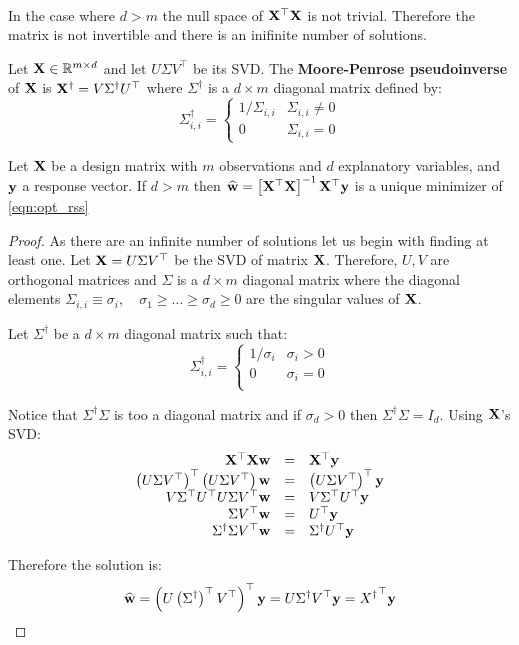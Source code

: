 ~\\In the case where $d>m$ the null space of $\mathbf{X}^\top\mathbf{X}$ is not trivial. Therefore the matrix is not invertible and there is an inifinite number of solutions. 
~\\
\begin{definition}
	Let $\mathbf{X}\in\mathbb{R}^{m\times d}$ and let $U\Sigma V^\top$ be its SVD. The \textbf{Moore-Penrose pseudoinverse} of $\mathbf{X}$ is $\mathbf{X}^\dagger=V\Sigma^\dagger U^\top$ where $\Sigma^\dagger$ is a $d\times m$ diagonal matrix defined by: $$ \Sigma^\dagger_{i,i}=\begin{cases} 1/\Sigma_{i,i} & \Sigma_{i,i}\neq 0 \\ 0 & \Sigma_{i,i}=0 \end{cases} $$
\end{definition}

\begin{theorem}
	Let $\mathbf{X}$ be a design matrix with $m$ observations and $d$ explanatory variables, and $\mathbf{y}$ a response vector. If $d>m$ then $\widehat{\mathbf{w}}=\left[\mathbf{X}^\top\mathbf{X}\right]^{-1}\mathbf{X}^\top\mathbf{y}$ is a unique minimizer of \eqref{eqn:opt_rss}
\end{theorem}
\begin{proof}
	As there are an infinite number of solutions let us begin with finding at least one. Let $\mathbf{X}=U\Sigma V^\top$ be the SVD of matrix $\mathbf{X}$. Therefore, $U,V$ are orthogonal matrices and $\Sigma$ is a $d\times m$ diagonal matrix where the diagonal elements $\Sigma_{i,i}\equiv\sigma_i,\quad \sigma_1\geq\ldots\geq\sigma_d\geq 0$ are the singular values of $\mathbf{X}$.
	
	Let $\Sigma^\dagger$ be a $d\times m$ diagonal matrix such that: 
	$$ \Sigma^\dagger_{i,i} = 
	\begin{cases}
	1/\sigma_i & \sigma_i > 0\\
	0 & \sigma_i = 0\\
	\end{cases} 
	$$
	
	Notice that $\Sigma^\dagger \Sigma$ is too a diagonal matrix and if $\sigma_d>0$ then $\Sigma^\dagger \Sigma=I_d$. Using $\mathbf{X}$'s SVD:
	$$\begin{array}{rcl}
		\mathbf{X}^{\top}\mathbf{X}\mathbf{w} & = & \mathbf{X}^{\top}\mathbf{y} \\
		\left(U\Sigma V^\top\right)^\top \left(U\Sigma V^\top \right)\mathbf{w} & = & \left(U\Sigma V^\top\right)^\top\mathbf{y}\\
		V\Sigma^\top U^\top U\Sigma V^\top\mathbf{w} & = & V\Sigma^\top U^\top \mathbf{y} \\
		\Sigma V^\top \mathbf{w} & = & U^\top\mathbf{y} \\
		\Sigma^\dagger \Sigma V^\top\mathbf{w} & = & \Sigma^\dagger U^\top \mathbf{y} \\
	\end{array}$$
	
	Therefore the solution is: $$ \widehat{\mathbf{w}} = \left(U\left(\Sigma^\dagger\right)^\top V^\top\right)^\top\mathbf{y} = U\Sigma^\dagger V^\top \mathbf{y} = {X^\dagger}^\top \mathbf{y} $$ 
\end{proof}



